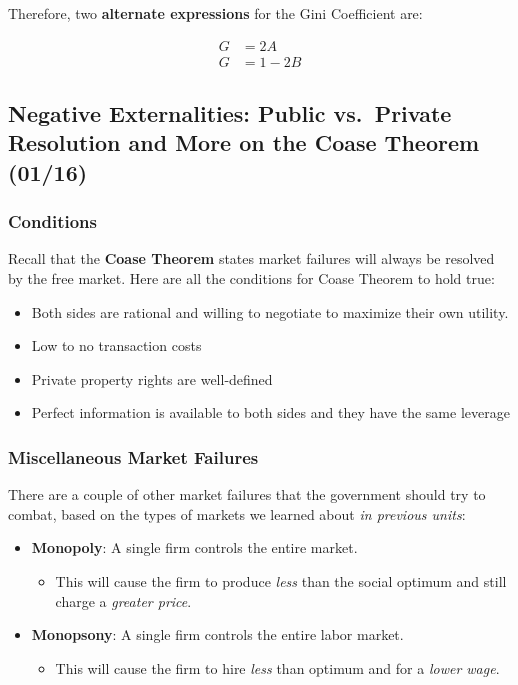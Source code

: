 \documentclass[
  letterpaper,
  DIV=11,
  numbers=noendperiod]{scrartcl}
\providecommand{\tightlist}{%
  \setlength{\itemsep}{0pt}\setlength{\parskip}{0pt}}\usepackage{longtable,booktabs,array}
\begin{document}
Therefore, two \textbf{alternate expressions} for the Gini Coefficient
are:

\begin{align}
G &= 2A \\
G &= 1-2B
\end{align}

\newpage{}

\subsection{Negative Externalities: Public vs.~Private Resolution and
More on the Coase Theorem
(01/16)}\label{negative-externalities-public-vs.-private-resolution-and-more-on-the-coase-theorem-0116}

\subsubsection{Conditions}\label{conditions}

Recall that the \textbf{Coase Theorem} states market failures will
always be resolved by the free market. Here are all the conditions for
Coase Theorem to hold true:

\begin{itemize}
\tightlist
\item
  Both sides are rational and willing to negotiate to maximize their own
  utility.
\item
  Low to no transaction costs
\item
  Private property rights are well-defined
\item
  Perfect information is available to both sides and they have the same
  leverage
\end{itemize}

\subsubsection{Miscellaneous Market
Failures}\label{miscellaneous-market-failures}

There are a couple of other market failures that the government should
try to combat, based on the types of markets we learned about \emph{in
previous units}:

\begin{itemize}
\tightlist
\item
  \textbf{Monopoly}: A single firm controls the entire market.

  \begin{itemize}
  \tightlist
  \item
    This will cause the firm to produce \emph{less} than the social
    optimum and still charge a \emph{greater price}.
  \end{itemize}
\item
  \textbf{Monopsony}: A single firm controls the entire labor market.

  \begin{itemize}
  \tightlist
  \item
    This will cause the firm to hire \emph{less} than optimum and for a
    \emph{lower wage}.
  \end{itemize}
\end{itemize}
\end{document}
